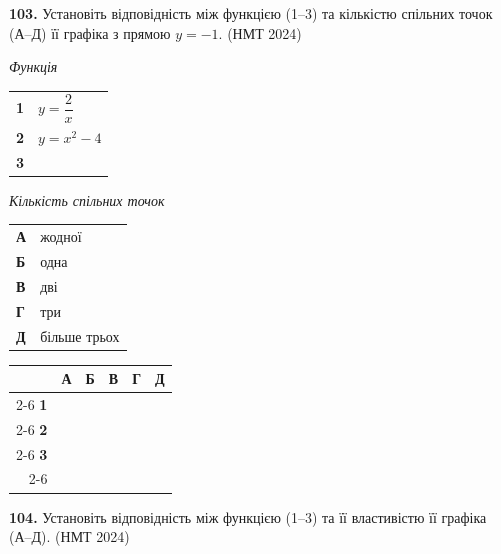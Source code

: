 \documentclass[14pt]{extarticle}
\newcommand{\answerGrid}{
    \begingroup
    \renewcommand{\arraystretch}{1.3} 
    \setlength{\tabcolsep}{7pt} 
    \begin{tabular}{r|c|c|c|c|c|}
         \multicolumn{1}{c}{} & \multicolumn{1}{c}{\textbf{А}} & \multicolumn{1}{c}{\textbf{Б}} & \multicolumn{1}{c}{\textbf{В}} & \multicolumn{1}{c}{\textbf{Г}} & \multicolumn{1}{c}{\textbf{Д}} \\ \cline{2-6}
         \textbf{1} & & & & & \\ \cline{2-6}
         \textbf{2} & & & & & \\ \cline{2-6}
         \textbf{3} & & & & & \\ \cline{2-6}
    \end{tabular}
    \endgroup
}
\newcommand{\matchingLayout}[3]{
    \noindent
    \begin{minipage}[t]{0.40\textwidth}
       
        #1
    \end{minipage}%
    \hfill
    \begin{minipage}[t]{0.28\textwidth}
        
        #2
    \end{minipage}%
    \hfill
    \begin{minipage}[t]{0.30\textwidth}
        \vspace{0pt} %
        \begin{flushright}
        #3
        \end{flushright}
    \end{minipage}
}
\newcommand{\nmtyear}[1]{\hfill{\small\color{yearcolor}(НМТ #1)}}
\begin{document}
\vspace{0.7cm}


\noindent\textbf{103.} Установіть відповідність між функцією (1--3) та кількістю спільних точок (А--Д) її графіка з прямою $y=-1$. \nmtyear{2024}


\vspace{0.3cm}

\matchingLayout{
    \textit{Функція} \par \vspace{0.2cm}
    \begin{tabular}{@{}p{0.5cm} l@{}}
    \textbf{1} & $y=\dfrac{2}{x}$ \\[0.6cm]
    \textbf{2} & $y=x^2-4$ \\[0.4cm]
    \textbf{3} & \trigStyle{$y=\sin x$} \\
    \end{tabular}
}{
    \textit{Кількість спільних точок} \par \vspace{0.2cm}
    \begin{tabular}{@{}p{0.5cm} l@{}}
    \textbf{А} & жодної \\[0.2cm]
    \textbf{Б} & одна \\[0.2cm]
    \textbf{В} & дві \\[0.2cm]
    \textbf{Г} & три \\[0.2cm]
    \textbf{Д} & більше трьох \\
    \end{tabular}
}{
    \answerGrid
}

\vspace{0.7cm}


\noindent\textbf{104.} Установіть відповідність між функцією (1--3) та її властивістю її графіка (А--Д). \nmtyear{2024}

\vspace{0.3cm}
\end{document}
